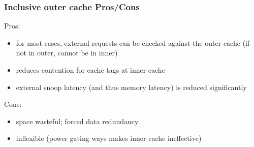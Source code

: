 \documentclass[12pt]{extarticle}
\begin{document}
	\subsubsection{Inclusive outer cache Pros/Cons}

	Pros:

	\begin{itemize}
		\item for most cases, external requests can be checked against the outer cache (if not in outer, cannot be in inner)
		\item reduces contention for cache tags at inner cache
		\item external snoop latency (and thus memory latency) is reduced significantly
	\end{itemize}
	
	\noindent Cons:

	\begin{itemize}
		\item space wasteful; forced data redundancy
		\item inflexible (power gating ways makes inner cache ineffective)
	\end{itemize}
\end{document}

